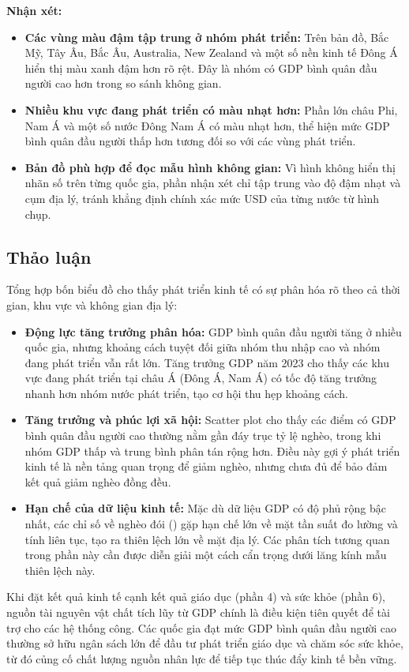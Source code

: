 \textbf{Nhận xét:}
\begin{itemize}
    \item \textbf{Các vùng màu đậm tập trung ở nhóm phát triển:} Trên bản đồ, Bắc Mỹ, Tây Âu, Bắc Âu, Australia, New Zealand và một số nền kinh tế Đông Á hiển thị màu xanh đậm hơn rõ rệt. Đây là nhóm có GDP bình quân đầu người cao hơn trong so sánh không gian.
    \item \textbf{Nhiều khu vực đang phát triển có màu nhạt hơn:} Phần lớn châu Phi, Nam Á và một số nước Đông Nam Á có màu nhạt hơn, thể hiện mức GDP bình quân đầu người thấp hơn tương đối so với các vùng phát triển.
    \item \textbf{Bản đồ phù hợp để đọc mẫu hình không gian:} Vì hình không hiển thị nhãn số trên từng quốc gia, phần nhận xét chỉ tập trung vào độ đậm nhạt và cụm địa lý, tránh khẳng định chính xác mức USD của từng nước từ hình chụp.
\end{itemize}

\subsection{Thảo luận}

Tổng hợp bốn biểu đồ cho thấy phát triển kinh tế có sự phân hóa rõ theo cả thời gian, khu vực và không gian địa lý:
\begin{itemize}
    \item \textbf{Động lực tăng trưởng phân hóa:} GDP bình quân đầu người tăng ở nhiều quốc gia, nhưng khoảng cách tuyệt đối giữa nhóm thu nhập cao và nhóm đang phát triển vẫn rất lớn. Tăng trưởng GDP năm 2023 cho thấy các khu vực đang phát triển tại châu Á (Đông Á, Nam Á) có tốc độ tăng trưởng nhanh hơn nhóm nước phát triển, tạo cơ hội thu hẹp khoảng cách.
    \item \textbf{Tăng trưởng và phúc lợi xã hội:} Scatter plot cho thấy các điểm có GDP bình quân đầu người cao thường nằm gần đáy trục tỷ lệ nghèo, trong khi nhóm GDP thấp và trung bình phân tán rộng hơn. Điều này gợi ý phát triển kinh tế là nền tảng quan trọng để giảm nghèo, nhưng chưa đủ để bảo đảm kết quả giảm nghèo đồng đều.
    \item \textbf{Hạn chế của dữ liệu kinh tế:} Mặc dù dữ liệu GDP có độ phủ rộng bậc nhất, các chỉ số về nghèo đói () gặp hạn chế lớn về mặt tần suất đo lường và tính liên tục, tạo ra thiên lệch lớn về mặt địa lý. Các phân tích tương quan trong phần này cần được diễn giải một cách cẩn trọng dưới lăng kính mẫu thiên lệch này.
\end{itemize}

Khi đặt kết quả kinh tế cạnh kết quả giáo dục (phần 4) và sức khỏe (phần 6), nguồn tài nguyên vật chất tích lũy từ GDP chính là điều kiện tiên quyết để tài trợ cho các hệ thống công. Các quốc gia đạt mức GDP bình quân đầu người cao thường sở hữu ngân sách lớn để đầu tư phát triển giáo dục và chăm sóc sức khỏe, từ đó củng cố chất lượng nguồn nhân lực để tiếp tục thúc đẩy kinh tế bền vững.
